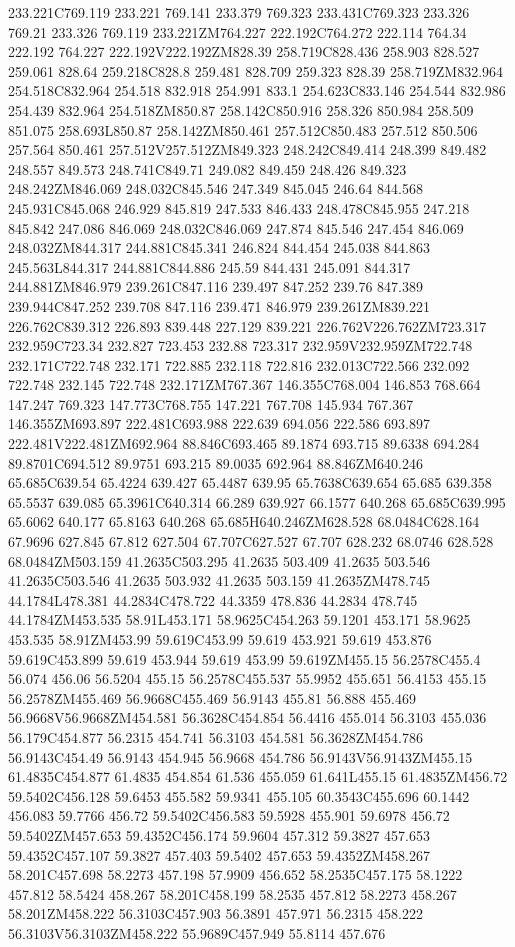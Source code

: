 233.221C769.119 233.221 769.141 233.379 769.323 233.431C769.323 233.326 769.21 233.326 769.119 233.221ZM764.227 222.192C764.272 222.114 764.34 222.192 764.227 222.192V222.192ZM828.39 258.719C828.436 258.903 828.527 259.061 828.64 259.218C828.8 259.481 828.709 259.323 828.39 258.719ZM832.964 254.518C832.964 254.518 832.918 254.991 833.1 254.623C833.146 254.544 832.986 254.439 832.964 254.518ZM850.87 258.142C850.916 258.326 850.984 258.509 851.075 258.693L850.87 258.142ZM850.461 257.512C850.483 257.512 850.506 257.564 850.461 257.512V257.512ZM849.323 248.242C849.414 248.399 849.482 248.557 849.573 248.741C849.71 249.082 849.459 248.426 849.323 248.242ZM846.069 248.032C845.546 247.349 845.045 246.64 844.568 245.931C845.068 246.929 845.819 247.533 846.433 248.478C845.955 247.218 845.842 247.086 846.069 248.032C846.069 247.874 845.546 247.454 846.069 248.032ZM844.317 244.881C845.341 246.824 844.454 245.038 844.863 245.563L844.317 244.881C844.886 245.59 844.431 245.091 844.317 244.881ZM846.979 239.261C847.116 239.497 847.252 239.76 847.389 239.944C847.252 239.708 847.116 239.471 846.979 239.261ZM839.221 226.762C839.312 226.893 839.448 227.129 839.221 226.762V226.762ZM723.317 232.959C723.34 232.827 723.453 232.88 723.317 232.959V232.959ZM722.748 232.171C722.748 232.171 722.885 232.118 722.816 232.013C722.566 232.092 722.748 232.145 722.748 232.171ZM767.367 146.355C768.004 146.853 768.664 147.247 769.323 147.773C768.755 147.221 767.708 145.934 767.367 146.355ZM693.897 222.481C693.988 222.639 694.056 222.586 693.897 222.481V222.481ZM692.964 88.846C693.465 89.1874 693.715 89.6338 694.284 89.8701C694.512 89.9751 693.215 89.0035 692.964 88.846ZM640.246 65.685C639.54 65.4224 639.427 65.4487 639.95 65.7638C639.654 65.685 639.358 65.5537 639.085 65.3961C640.314 66.289 639.927 66.1577 640.268 65.685C639.995 65.6062 640.177 65.8163 640.268 65.685H640.246ZM628.528 68.0484C628.164 67.9696 627.845 67.812 627.504 67.707C627.527 67.707 628.232 68.0746 628.528 68.0484ZM503.159 41.2635C503.295 41.2635 503.409 41.2635 503.546 41.2635C503.546 41.2635 503.932 41.2635 503.159 41.2635ZM478.745 44.1784L478.381 44.2834C478.722 44.3359 478.836 44.2834 478.745 44.1784ZM453.535 58.91L453.171 58.9625C454.263 59.1201 453.171 58.9625 453.535 58.91ZM453.99 59.619C453.99 59.619 453.921 59.619 453.876 59.619C453.899 59.619 453.944 59.619 453.99 59.619ZM455.15 56.2578C455.4 56.074 456.06 56.5204 455.15 56.2578C455.537 55.9952 455.651 56.4153 455.15 56.2578ZM455.469 56.9668C455.469 56.9143 455.81 56.888 455.469 56.9668V56.9668ZM454.581 56.3628C454.854 56.4416 455.014 56.3103 455.036 56.179C454.877 56.2315 454.741 56.3103 454.581 56.3628ZM454.786 56.9143C454.49 56.9143 454.945 56.9668 454.786 56.9143V56.9143ZM455.15 61.4835C454.877 61.4835 454.854 61.536 455.059 61.641L455.15 61.4835ZM456.72 59.5402C456.128 59.6453 455.582 59.9341 455.105 60.3543C455.696 60.1442 456.083 59.7766 456.72 59.5402C456.583 59.5928 455.901 59.6978 456.72 59.5402ZM457.653 59.4352C456.174 59.9604 457.312 59.3827 457.653 59.4352C457.107 59.3827 457.403 59.5402 457.653 59.4352ZM458.267 58.201C457.698 58.2273 457.198 57.9909 456.652 58.2535C457.175 58.1222 457.812 58.5424 458.267 58.201C458.199 58.2535 457.812 58.2273 458.267 58.201ZM458.222 56.3103C457.903 56.3891 457.971 56.2315 458.222 56.3103V56.3103ZM458.222 55.9689C457.949 55.8114 457.676 